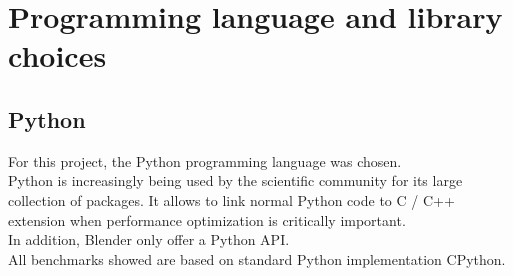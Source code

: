 \chapter{Programming language and library choices}
\label{chap:programming_language_library_choices}

\section{Python}
For this project, the Python programming language was chosen. \cite{python-website} \\
Python is increasingly being used by the scientific community for its large collection of packages. It allows to link normal Python code to C / C++ extension when performance optimization is critically important. \\
In addition, Blender only offer a Python API. \\
All benchmarks showed are based on standard Python implementation CPython.

